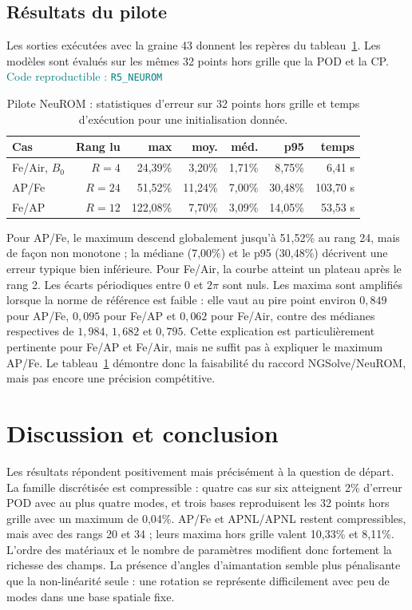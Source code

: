 \documentclass[10pt,a4paper]{article}
\newcommand{\codecell}[1]{\textcolor{teal}{\textsf{Code reproductible : \texttt{#1}}}}
\begin{document}
\subsection{Résultats du pilote}
Les sorties exécutées avec la graine 43 donnent les repères du tableau~\ref{tab:neurom}. Les modèles sont évalués sur les mêmes 32 points hors grille que la POD et la CP. \codecell{R5\_NEUROM}

\begin{table}[ht]
\centering\small
\begin{tabular}{@{}lrrrrrr@{}}
\toprule
Cas & Rang lu & max & moy. & méd. & p95 & temps\\
\midrule
Fe/Air, $B_0$ & $R=4$ & 24,39\% & 3,20\% & 1,71\% & 8,75\% & 6,41 s\\
AP/Fe & $R=24$ & 51,52\% & 11,24\% & 7,00\% & 30,48\% & 103,70 s\\
Fe/AP & $R=12$ & 122,08\% & 7,70\% & 3,09\% & 14,05\% & 53,53 s\\
\bottomrule
\end{tabular}
\caption{Pilote NeuROM : statistiques d'erreur sur 32 points hors grille et temps d'exécution pour une initialisation donnée.}
\label{tab:neurom}
\end{table}

Pour AP/Fe, le maximum descend globalement jusqu'à 51,52\% au rang 24, mais de façon non monotone ; la médiane (7,00\%) et le p95 (30,48\%) décrivent une erreur typique bien inférieure. Pour Fe/Air, la courbe atteint un plateau après le rang 2. Les écarts périodiques entre $0$ et $2\pi$ sont nuls. Les maxima sont amplifiés lorsque la norme de référence est faible : elle vaut au pire point environ $0{,}849$ pour AP/Fe, $0{,}095$ pour Fe/AP et $0{,}062$ pour Fe/Air, contre des médianes respectives de $1{,}984$, $1{,}682$ et $0{,}795$. Cette explication est particulièrement pertinente pour Fe/AP et Fe/Air, mais ne suffit pas à expliquer le maximum AP/Fe. Le tableau~\ref{tab:neurom} démontre donc la faisabilité du raccord NGSolve/NeuROM, mais pas encore une précision compétitive.

\section{Discussion et conclusion}
Les résultats répondent positivement mais précisément à la question de départ. La famille discrétisée est compressible : quatre cas sur six atteignent 2\% d'erreur POD avec au plus quatre modes, et trois bases reproduisent les 32 points hors grille avec un maximum de 0,04\%. AP/Fe et APNL/APNL restent compressibles, mais avec des rangs 20 et 34 ; leurs maxima hors grille valent 10,33\% et 8,11\%. L'ordre des matériaux et le nombre de paramètres modifient donc fortement la richesse des champs. La présence d'angles d'aimantation semble plus pénalisante que la non-linéarité seule : une rotation se représente difficilement avec peu de modes dans une base spatiale fixe.
\end{document}
